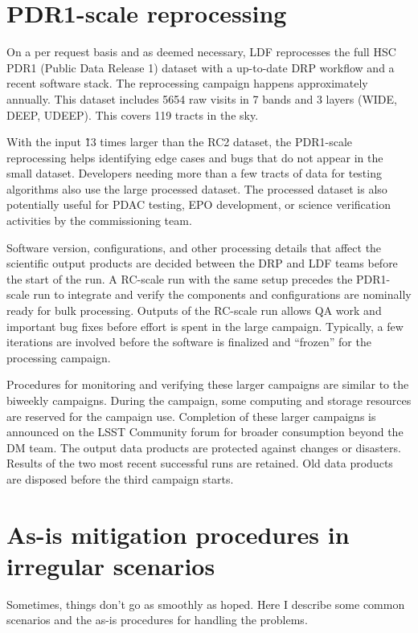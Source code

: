 \documentclass[DM,authoryear,toc]{lsstdoc}
\begin{document}
\section{PDR1-scale reprocessing}

On a per request basis and as deemed necessary, LDF reprocesses the
full HSC PDR1 (Public Data Release 1) dataset with a up-to-date DRP
workflow and a recent software stack. The reprocessing campaign
happens approximately annually. This dataset includes 5654 raw
visits in 7 bands and 3 layers (WIDE, DEEP, UDEEP). This covers 119
tracts in the sky.

With the input \~13 times larger than the RC2 dataset, the PDR1-scale
reprocessing helps identifying edge cases and bugs that do not
appear in the small dataset.  Developers needing more than a few
tracts of data for testing algorithms also use the large processed
dataset. The processed dataset is also potentially useful for PDAC
testing, EPO development, or science verification activities by the
commissioning team.

Software version, configurations, and other processing details that
affect the scientific output products are decided between the DRP
and LDF teams before the start of the run. A RC-scale run with the
same setup precedes the PDR1-scale run to integrate and verify the
components and configurations are nominally ready for bulk processing.
Outputs of the RC-scale run allows QA work and important bug fixes
before effort is spent in the large campaign.  Typically, a few
iterations are involved before the software is finalized and “frozen”
for the processing campaign.

Procedures for monitoring and verifying these larger campaigns are
similar to the biweekly campaigns. During the campaign, some computing
and storage resources are reserved for the campaign use. Completion
of these larger campaigns is announced on the LSST Community forum
for broader consumption beyond the DM team. The output data products
are protected against changes or disasters. Results of the two most
recent successful runs are retained.  Old data products are disposed
before the third campaign starts.

\section{As-is mitigation procedures in irregular scenarios}

Sometimes, things don’t go as smoothly as hoped. Here I describe
some common scenarios and the as-is procedures for handling the
problems.
\end{document}
